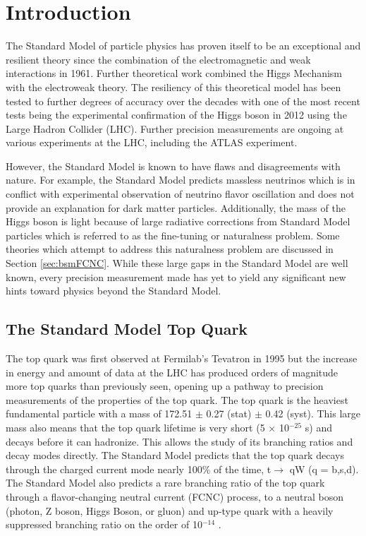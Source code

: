 \chapter{Introduction}
\label{ch:Introduction}



The Standard Model of particle physics has proven itself to be an exceptional and resilient theory since the combination of the electromagnetic and weak interactions in 1961\cite{SM1Glashow}.  Further theoretical work combined the Higgs Mechanism\cite{Higgs1,Higgs2} with the electroweak theory\cite{SM2Weinberg, SM3Salam}.  The resiliency of this theoretical model has been tested to further degrees of accuracy over the decades with one of the most recent tests being the experimental confirmation of the Higgs boson in 2012\cite{Higgs3,Higgs4} using the Large Hadron Collider (LHC).  Further precision measurements are ongoing at various experiments at the LHC, including the ATLAS experiment.

However, the Standard Model is known to have flaws and disagreements with nature.  For example, the Standard Model predicts massless neutrinos which is in conflict with experimental observation of neutrino flavor oscillation and does not provide an explanation for dark matter particles. Additionally, the mass of the Higgs boson is light because of large radiative corrections from Standard Model particles which is referred to as the fine-tuning or naturalness problem.  Some theories which attempt to address this naturalness problem are discussed in Section \ref{sec:bsmFCNC}.  While these large gaps in the Standard Model are well known, every precision measurement made has yet to yield any significant new hints toward physics beyond the Standard Model.  

\section{The Standard Model Top Quark}
The top quark was first observed at Fermilab's Tevatron in 1995\cite{TopObs} but the increase in energy and amount of data at the LHC has produced orders of magnitude more top quarks than previously seen, opening up a pathway to precision measurements of the properties of the top quark.  The top quark is the heaviest fundamental particle with a mass of 172.51 $\pm$ 0.27 (stat) $\pm$ 0.42 (syst)\cite{TopMass2017}.  This large mass also means that the top quark lifetime is very short (5 $\times$ 10$^{-25}$ s) and decays before it can hadronize.  This allows the study of its branching ratios and decay modes directly.  The Standard Model predicts that the top quark decays through the charged current mode nearly 100\% of the time, t$\rightarrow$ qW (q = b,s,d)\cite{PDG2018}.   The Standard Model also predicts a rare branching ratio of the top quark through a flavor-changing neutral current (FCNC) process, to a neutral boson (photon, Z boson, Higgs Boson, or gluon) and up-type quark with a heavily suppressed branching ratio on the order of 10$^{-14}$ \cite{2HDM-2}.

